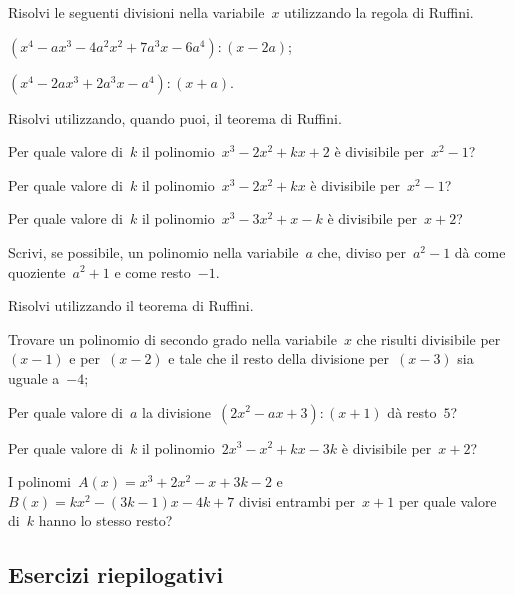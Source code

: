 \begin{esercizio}[\Ast]
\label{ese:11.39}
Risolvi le seguenti divisioni nella variabile~$x$ utilizzando la regola di Ruffini.
 \begin{enumeratea}
 \item $\left(x^{4}-ax^{3}-4a^{2}x^{2}+7a^{3}x-6a^{4}\right):(x-2a)$;
 \item $\left(x^{4}-2ax^{3}+2a^{3}x-a^{4}\right):(x+a)$.
 \end{enumeratea}
\end{esercizio}

\begin{esercizio}[\Ast]
\label{ese:11.40}
Risolvi utilizzando, quando puoi, il teorema di Ruffini.
 \begin{enumeratea}
 \item Per quale valore di~$k$ il polinomio~$x^{3}-2x^{2}+kx+2$ è divisibile per~$x^{2}-1$?
 \item Per quale valore di~$k$ il polinomio~$x^{3}-2x^{2}+kx$ è divisibile per~$x^{2}-1$?
 \item Per quale valore di~$k$ il polinomio~$x^{3}-3x^{2}+x-k$ è divisibile per~$x+2$?
 \item Scrivi, se possibile, un polinomio nella variabile~$a$ che, diviso per~$a^{2}-1$ dà come quoziente~$a^{2}+1$ e come resto~$-1$.
 \end{enumeratea}
\end{esercizio}

\begin{esercizio}[\Ast]
\label{ese:11.41}
Risolvi utilizzando il teorema di Ruffini.
 \begin{enumeratea}
 \item Trovare un polinomio di secondo grado nella variabile~$x$ che risulti divisibile per~$(x-1)$ e per~$(x-2)$ e tale che
     il resto della divisione per~$(x-3)$ sia uguale a~$-4$;
 \item Per quale valore di~$a$ la divisione~$\left(2x^{2}-ax+3\right):(x+1)$ dà resto~$5$?
 \item Per quale valore di~$k$ il polinomio~$2x^{3}-x^{2}+kx-3k$ è divisibile per~$x+2$?
 \item I polinomi~$A(x)=x^3+2x^2-x+3k-2$ e~$B(x)=kx^2-(3k-1)x-4k+7$ divisi entrambi per~$x+1$ per quale valore di~$k$ hanno lo stesso resto?
 \end{enumeratea}
\end{esercizio}

\subsection{Esercizi riepilogativi}

